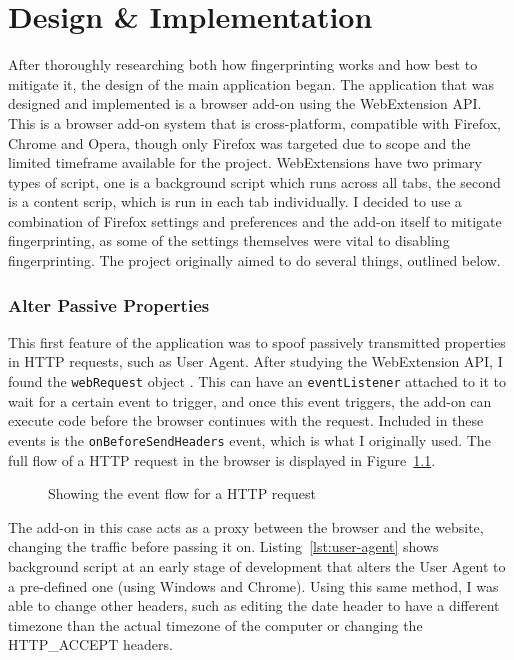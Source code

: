 \chapter{Design \& Implementation}

After thoroughly researching both how fingerprinting works and how best to mitigate it, the design of the main application began.
The application that was designed and implemented is a browser add-on using the WebExtension API\@.
This is a browser add-on system that is cross-platform, compatible with Firefox, Chrome and Opera, though only Firefox was targeted due to scope and the limited timeframe available for the project.
WebExtensions have two primary types of script, one is a background script which runs across all tabs, the second is a content scrip, which is run in each tab individually.
I decided to use a combination of Firefox settings and preferences and the add-on itself to mitigate fingerprinting, as some of the settings themselves were vital to disabling fingerprinting.
The project originally aimed to do several things, outlined below.

\subsection{Alter Passive Properties}

This first feature of the application was to spoof passively transmitted properties in HTTP requests, such as User Agent.
After studying the WebExtension API, I found the \texttt{webRequest} object \citep{webRequest}.
This can have an \texttt{eventListener} attached to it to wait for a certain event to trigger, and once this event triggers, the add-on can execute code before the browser continues with the request.
Included in these events is the \texttt{onBeforeSendHeaders} event, which is what I originally used.
The full flow of a HTTP request in the browser is displayed in Figure~\ref{fig:webRequest-flow}.

\begin{figure}[h]
\caption{Showing the event flow for a HTTP request}
\centering
\label{fig:webRequest-flow}
\end{figure}

The add-on in this case acts as a proxy between the browser and the website, changing the traffic before passing it on.
Listing~\ref{lst:user-agent} shows background script at an early stage of development that alters the User Agent to a pre-defined one (using Windows and Chrome).
Using this same method, I was able to change other headers, such as editing the date header to have a different timezone than the actual timezone of the computer or changing the HTTP\_ACCEPT headers.

